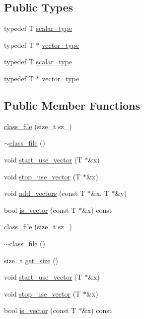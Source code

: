 \subsection*{Public Types}
\begin{DoxyCompactItemize}
\item 
typedef T \hyperlink{classtest__class_1_1class__file_a4a1b0b0803393eef737a5af7de611879}{scalar\-\_\-type}
\item 
typedef T $\ast$ \hyperlink{classtest__class_1_1class__file_abe63b9f832b951bdde090c87f78a92a5}{vector\-\_\-type}
\item 
typedef T \hyperlink{classtest__class_1_1class__file_a4a1b0b0803393eef737a5af7de611879}{scalar\-\_\-type}
\item 
typedef T $\ast$ \hyperlink{classtest__class_1_1class__file_abe63b9f832b951bdde090c87f78a92a5}{vector\-\_\-type}
\end{DoxyCompactItemize}
\subsection*{Public Member Functions}
\begin{DoxyCompactItemize}
\item 
\hyperlink{classtest__class_1_1class__file_a892ae15bc27c844d0946bdaf02322aed}{class\-\_\-file} (size\-\_\-t sz\-\_\-)
\item 
\hyperlink{classtest__class_1_1class__file_af9024a9e3acf28dd5ac62c36a59fa48d}{$\sim$class\-\_\-file} ()
\item 
void \hyperlink{classtest__class_1_1class__file_ae0bbcb0c47c4332631581af9132a17c3}{start\-\_\-use\-\_\-vector} (T $\ast$\&x)
\item 
void \hyperlink{classtest__class_1_1class__file_a61c9997de3a72818b730b20812436e4f}{stop\-\_\-use\-\_\-vector} (T $\ast$\&x)
\item 
void \hyperlink{classtest__class_1_1class__file_aa92d0aaaa73a077fd8257ac4d2638a19}{add\-\_\-vectors} (const T $\ast$\&x, T $\ast$\&y)
\item 
bool \hyperlink{classtest__class_1_1class__file_a93c134c56388038d2ce68b5db3278044}{is\-\_\-vector} (const T $\ast$\&x) const 
\item 
\hyperlink{classtest__class_1_1class__file_a892ae15bc27c844d0946bdaf02322aed}{class\-\_\-file} (size\-\_\-t sz\-\_\-)
\item 
\hyperlink{classtest__class_1_1class__file_af9024a9e3acf28dd5ac62c36a59fa48d}{$\sim$class\-\_\-file} ()
\item 
size\-\_\-t \hyperlink{classtest__class_1_1class__file_a94a68418bcbcd7fd27dcf7832bd62f5b}{get\-\_\-size} ()
\item 
void \hyperlink{classtest__class_1_1class__file_ae0bbcb0c47c4332631581af9132a17c3}{start\-\_\-use\-\_\-vector} (T $\ast$\&x)
\item 
void \hyperlink{classtest__class_1_1class__file_a61c9997de3a72818b730b20812436e4f}{stop\-\_\-use\-\_\-vector} (T $\ast$\&x)
\item 
bool \hyperlink{classtest__class_1_1class__file_a93c134c56388038d2ce68b5db3278044}{is\-\_\-vector} (const T $\ast$\&x) const 
\end{DoxyCompactItemize}


